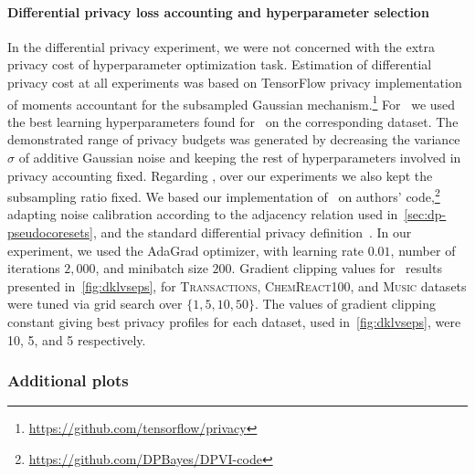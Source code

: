 \paragraph{Differential privacy loss accounting and hyperparameter selection}  
\renewcommand{\thempfootnote}{\arabic{mpfootnote}}
  \begin{minipage}{\linewidth}
In the differential privacy experiment, we were not concerned with the extra privacy cost of hyperparameter optimization task.  Estimation of differential privacy cost at all experiments was based on TensorFlow privacy implementation of moments accountant for the subsampled Gaussian mechanism.\footnote{\href{https://github.com/tensorflow/privacy}{https://github.com/tensorflow/privacy}} 
For \dpsvi~we used the best learning hyperparameters found for \psvi~on the corresponding dataset. The demonstrated range of privacy budgets was generated by decreasing the variance $ \sigma $ of additive Gaussian noise and keeping the rest of hyperparameters involved in privacy accounting fixed.  
Regarding \dpvi, over our experiments we also kept the subsampling ratio fixed. We based our implementation of \dpvi~on authors' code,\footnote{\href{https://github.com/DPBayes/DPVI-code}{https://github.com/DPBayes/DPVI-code}} adapting noise calibration according to the adjacency relation used in~\cref{sec:dp-pseudocoresets}, and the standard differential privacy definition~\citep{dwork14}. In our experiment, we used the AdaGrad optimizer, with learning rate $0.01$, number of iterations $2,000$, and minibatch size $200$. Gradient clipping values for \dpvi~results presented in~\cref{fig:dklvseps}, for \textsc{Transactions}, \textsc{ChemReact100}, and \textsc{Music} datasets were tuned via grid search over ${\{1, 5, 10, 50\}}$. The values of gradient clipping constant giving best privacy profiles for each dataset, used in~\cref{fig:dklvseps}, were 10, 5, and 5 respectively. 
\end{minipage}


\subsubsection{Additional plots}
\label{app:cpu_timings}

